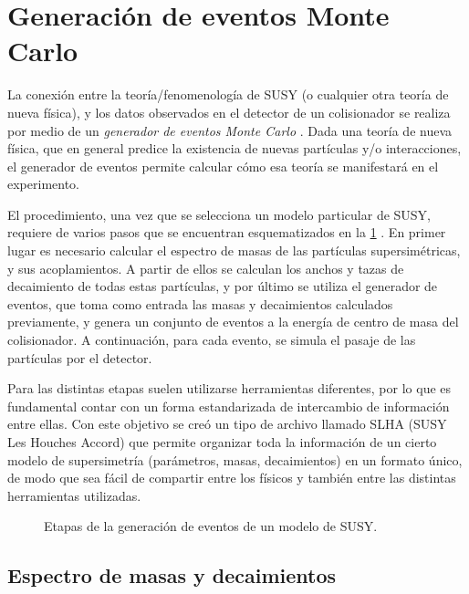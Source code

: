 \section{Generación de eventos Monte Carlo}

La conexión entre la teoría/fenomenología de SUSY (o cualquier otra teoría de
nueva física), y los datos observados en el detector de un colisionador se
realiza por medio de un \emph{generador de eventos Monte Carlo}
\cite{Sjostrand:2006su,Dobbs:2004qw}. Dada una teoría de nueva física, que en
general predice la existencia de nuevas partículas y/o interacciones, el
generador de eventos permite calcular cómo esa teoría se manifestará en el
experimento.

El procedimiento, una vez que se selecciona un modelo particular de SUSY,
requiere de varios pasos que se encuentran esquematizados en la
\cref{fig:mc_sketch} \cite{Baer:2009tk}. En primer lugar es necesario calcular
el espectro de masas de las partículas supersimétricas, y sus acoplamientos. A
partir de ellos se calculan los anchos y tazas de decaimiento de todas estas
partículas, y por último se utiliza el generador de eventos, que toma como entrada las
masas y decaimientos calculados previamente, y genera un conjunto de eventos a
la energía de centro de masa del colisionador. A continuación, para cada evento,
se simula el pasaje de las partículas por el detector.

Para las distintas etapas suelen
utilizarse herramientas diferentes, por lo que es fundamental contar con un
forma estandarizada de intercambio de información entre ellas. Con este objetivo
se creó un tipo de archivo llamado SLHA (SUSY Les Houches Accord)\cite{SLHA} que
permite organizar toda la información de un cierto modelo de supersimetría
(parámetros, masas, decaimientos) en un formato único, de modo que sea fácil de
compartir entre los físicos y también entre las distintas herramientas
utilizadas.

\begin{figure}[!htbp]
  \centering

  \scalebox{0.71}{}

  \caption{Etapas de la generación de eventos de un modelo de SUSY.}
  \label{fig:mc_sketch}
\end{figure}


\subsection{Espectro de masas y decaimientos}

